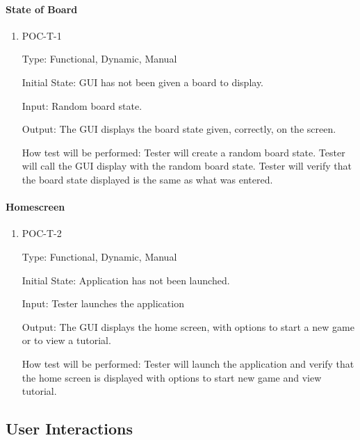 \documentclass[12pt, titlepage]{article}
\begin{document}
\paragraph{State of Board}
\begin{enumerate}
\item{POC-T-1}

Type: Functional, Dynamic, Manual

Initial State: GUI has not been given a board to display.
					
Input: Random board state.
					
Output: The GUI displays the board state given, correctly, on the screen.
					
How test will be performed: Tester will create a random board state. Tester will call the GUI display with the random board state. Tester will verify that the board state displayed is the same as what was entered.
\end{enumerate}
\paragraph{Homescreen}
\begin{enumerate}

\item{POC-T-2}

Type: Functional, Dynamic, Manual

Initial State: Application has not been launched.

Input: Tester launches the application
	
Output: The GUI displays the home screen, with options to start a new game or to view a tutorial.
	
How test will be performed: Tester will launch the application and verify that the home screen is displayed with options to start new game and view tutorial.

\end{enumerate}

\subsection{User Interactions}
\end{document}

